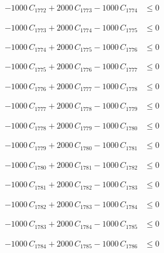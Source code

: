 \documentclass[a4paper,11pt]{article}
\begin{document}
\begin{align}
-1000\,C_{1772} + 2000\,C_{1773} - 1000\,C_{1774} &\leq 0 \nonumber
\end{align}

\begin{align}
-1000\,C_{1773} + 2000\,C_{1774} - 1000\,C_{1775} &\leq 0 \nonumber
\end{align}

\begin{align}
-1000\,C_{1774} + 2000\,C_{1775} - 1000\,C_{1776} &\leq 0 \nonumber
\end{align}

\begin{align}
-1000\,C_{1775} + 2000\,C_{1776} - 1000\,C_{1777} &\leq 0 \nonumber
\end{align}

\begin{align}
-1000\,C_{1776} + 2000\,C_{1777} - 1000\,C_{1778} &\leq 0 \nonumber
\end{align}

\begin{align}
-1000\,C_{1777} + 2000\,C_{1778} - 1000\,C_{1779} &\leq 0 \nonumber
\end{align}

\begin{align}
-1000\,C_{1778} + 2000\,C_{1779} - 1000\,C_{1780} &\leq 0 \nonumber
\end{align}

\begin{align}
-1000\,C_{1779} + 2000\,C_{1780} - 1000\,C_{1781} &\leq 0 \nonumber
\end{align}

\begin{align}
-1000\,C_{1780} + 2000\,C_{1781} - 1000\,C_{1782} &\leq 0 \nonumber
\end{align}

\begin{align}
-1000\,C_{1781} + 2000\,C_{1782} - 1000\,C_{1783} &\leq 0 \nonumber
\end{align}

\begin{align}
-1000\,C_{1782} + 2000\,C_{1783} - 1000\,C_{1784} &\leq 0 \nonumber
\end{align}

\begin{align}
-1000\,C_{1783} + 2000\,C_{1784} - 1000\,C_{1785} &\leq 0 \nonumber
\end{align}

\begin{align}
-1000\,C_{1784} + 2000\,C_{1785} - 1000\,C_{1786} &\leq 0 \nonumber
\end{align}
\end{document}
